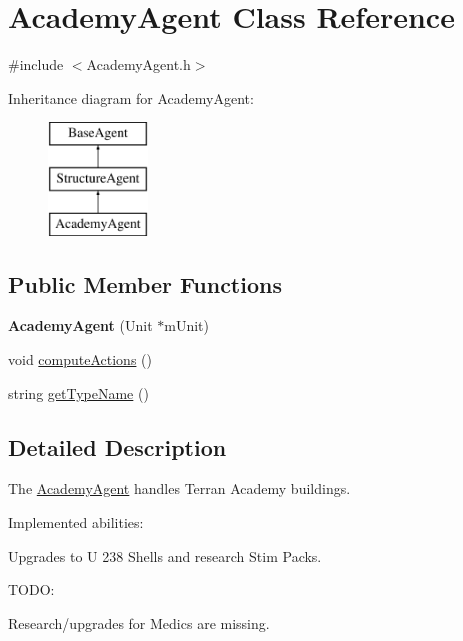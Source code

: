 \hypertarget{class_academy_agent}{
\section{AcademyAgent Class Reference}
\label{class_academy_agent}
}


{\ttfamily \#include $<$AcademyAgent.h$>$}

Inheritance diagram for AcademyAgent:\begin{figure}[H]
\begin{center}
\leavevmode
\includegraphics[height=3.000000cm]{class_academy_agent}
\end{center}
\end{figure}
\subsection*{Public Member Functions}
\begin{DoxyCompactItemize}
\item 
\hypertarget{class_academy_agent_a6e9118fd5995186a41c4344c3037b520}{
{\bfseries AcademyAgent} (Unit $\ast$mUnit)}
\label{class_academy_agent_a6e9118fd5995186a41c4344c3037b520}

\item 
void \hyperlink{class_academy_agent_a21879ae618f0e1b9bdf29e64d2a5d2ac}{computeActions} ()
\item 
string \hyperlink{class_academy_agent_a6932ff43bb7ab5773a41cb33adb20f51}{getTypeName} ()
\end{DoxyCompactItemize}


\subsection{Detailed Description}
The \hyperlink{class_academy_agent}{AcademyAgent} handles Terran Academy buildings.

Implemented abilities:
\begin{DoxyItemize}
\item Upgrades to U 238 Shells and research Stim Packs.
\end{DoxyItemize}

TODO:
\begin{DoxyItemize}
\item Research/upgrades for Medics are missing.
\end{DoxyItemize}

